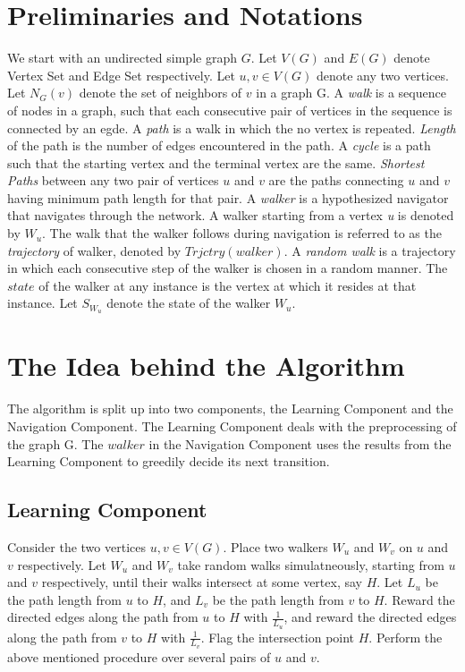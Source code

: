 \documentclass{article}
\begin{document}
\section{Preliminaries and Notations}
We start with an undirected simple graph $G$. Let $V(G)$ and $E(G)$ denote Vertex Set and Edge Set respectively. Let $u,v \in V(G)$ denote any two vertices. Let $N_{G}(v)$ denote the set of neighbors of $v$ in a graph G. A \textit{walk} is a sequence of nodes in a graph, such that each consecutive pair of vertices in the sequence is connected by an egde. A \textit{path} is a walk in which the no vertex is repeated. \textit{Length} of the path is the number of edges encountered in the path. A \textit{cycle} is a path such that the starting vertex and the terminal vertex are the same. \textit{Shortest Paths} between any two pair of vertices $u$ and $v$ are the paths connecting $u$ and $v$ having minimum path length for that pair. A \textit{walker} is a hypothesized navigator that navigates through the network. A walker starting from a vertex \textit{u} is denoted by $W_u$. The walk that the walker follows during navigation is referred to as the \textit{trajectory} of walker, denoted by $Trjctry(walker)$. A \textit{random walk} is a trajectory in which each consecutive step of the walker is chosen in a random manner. The $state$ of the walker at any instance is the vertex at which it resides at that instance. Let $S_{W_u}$ denote the state of the walker $W_u$.\\

\section{The Idea behind the Algorithm}

The algorithm is split up into two components, the Learning Component and the Navigation Component. The Learning Component deals with the preprocessing of the graph G. The $walker$ in the Navigation Component uses the results from the Learning Component to greedily decide its next transition.\\

\subsection{Learning Component}
Consider the two vertices $u,v \in V(G)$. Place two walkers $W_u$ and $W_v$ on $u$ and $v$ respectively. Let $W_u$ and $W_v$ take random walks simulatneously, starting from $u$ and $v$ respectively, until their walks intersect at some vertex, say $H$. Let $L_u$ be the path length from $u$ to $H$, and $L_v$ be the path length from $v$ to $H$. Reward the directed edges along the path from $u$ to $H$ with $\frac{1}{L_u}$, and reward the directed edges along the path from $v$ to $H$ with $\frac{1}{L_v}$. Flag the intersection point $H$. Perform the above mentioned procedure over several pairs of $u$ and $v$.\\
\end{document}
